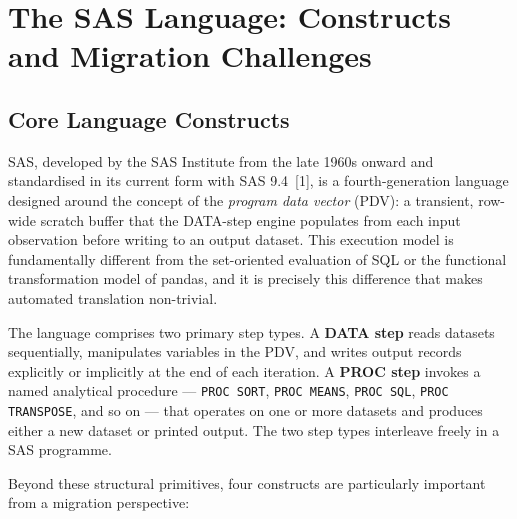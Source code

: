 \section{The SAS Language: Constructs and Migration Challenges}
\label{sec:sas-language}

\subsection{Core Language Constructs}
\label{subsec:sas-constructs}

SAS, developed by the SAS Institute from the late 1960s onward and standardised
in its current form with SAS 9.4~[1], is a fourth-generation language designed
around the concept of the \emph{program data vector} (PDV): a transient,
row-wide scratch buffer that the DATA-step engine populates from each input
observation before writing to an output dataset. This execution model is
fundamentally different from the set-oriented evaluation of SQL or the
functional transformation model of pandas, and it is precisely this difference
that makes automated translation non-trivial.

The language comprises two primary step types. A \textbf{DATA step} reads
datasets sequentially, manipulates variables in the PDV, and writes output
records explicitly or implicitly at the end of each iteration. A \textbf{PROC
step} invokes a named analytical procedure --- \texttt{PROC SORT},
\texttt{PROC MEANS}, \texttt{PROC SQL}, \texttt{PROC TRANSPOSE}, and so on ---
that operates on one or more datasets and produces either a new dataset or
printed output. The two step types interleave freely in a SAS programme.

Beyond these structural primitives, four constructs are particularly important
from a migration perspective:

